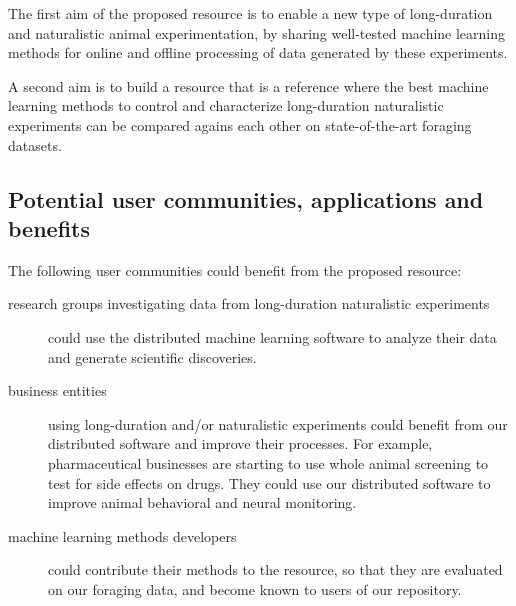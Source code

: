 The first aim of the proposed resource is to enable a new type of
long-duration and naturalistic animal experimentation, by sharing well-tested
machine learning methods for online and offline processing of data generated by
these experiments.

A second aim is to build a resource that is a reference where the best machine
learning methods to control and characterize long-duration naturalistic
experiments can be compared agains each other on state-of-the-art foraging
datasets.

\subsection{Potential user communities, applications and benefits}

The following user communities could benefit from the proposed resource:

\begin{description}

    \item[research groups investigating data from long-duration naturalistic
        experiments] could use the distributed machine learning software to analyze their
        data and generate scientific discoveries.

    \item[business entities] using long-duration and/or naturalistic
        experiments could benefit from our distributed software and improve
        their processes. For example, pharmaceutical businesses are starting to
        use whole animal screening to test for side effects on drugs. They
        could use our distributed software to improve animal behavioral and
        neural monitoring.

    \item[machine learning methods developers] could contribute their methods
        to the resource, so that they are evaluated on our foraging data, and
        become known to users of our repository.

\end{description}

